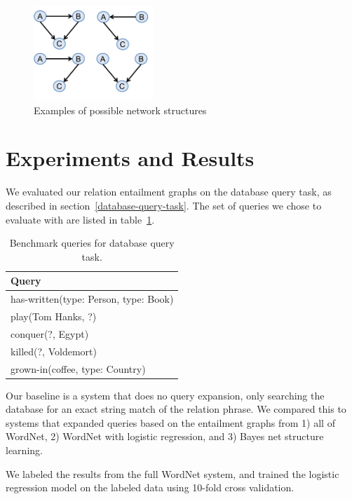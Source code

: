 \documentclass{article}
\begin{document}
\begin{figure}[h]
\begin{center}
\includegraphics[width=0.4\textwidth]{figures/example-net-structures.pdf}
\end{center}
\caption{Examples of possible network structures}\label{example-net-structures}
\end{figure}


\section{Experiments and Results}
We evaluated our relation entailment graphs on the database query task, as described in section~\ref{database-query-task}. The set of queries we chose to evaluate with are listed in table~\ref{benchmark-queries}.

\begin{table}[h]
  \caption{Benchmark queries for database query task.}\label{benchmark-queries} 
  \begin{center}
    \begin{tabular}{l}
      \toprule
      Query\\
      \midrule
      has-written(type: Person, type: Book)\\
      play(Tom Hanks, ?)\\
      conquer(?, Egypt)\\
      killed(?, Voldemort)\\
      grown-in(coffee, type: Country)\\
      \bottomrule
    \end{tabular}
  \end{center}
\end{table}

Our baseline is a system that does no query expansion, only searching the database for an exact string match of the relation phrase. We compared this to systems that expanded queries based on the entailment graphs from 1) all of WordNet, 2) WordNet with logistic regression, and 3) Bayes net structure learning.

We labeled the results from the full WordNet system, and trained the logistic regression model on the labeled data using 10-fold cross validation.
\end{document}
